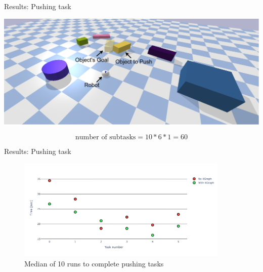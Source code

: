 \begin{frame}[fragile]{Results: Pushing task} 
\begin{center}
   \includegraphics[width=1.0\textwidth]{figures/results/random_1.drawio}
\end{center}

\vspace{-1cm}
\[\textrm{number of subtasks} = 10 * 6 * 1 = 60\]
\end{frame}


\begin{frame}[fragile]{Results: Pushing task} 

\begin{center}
  \begin{figure}[H]
      \centering
 \includegraphics[width=0.9\textwidth]{figures/results/random_push_time_vs}
  \caption{Median of 10 runs to complete pushing tasks}
  \end{figure}
\end{center}
\end{frame}



